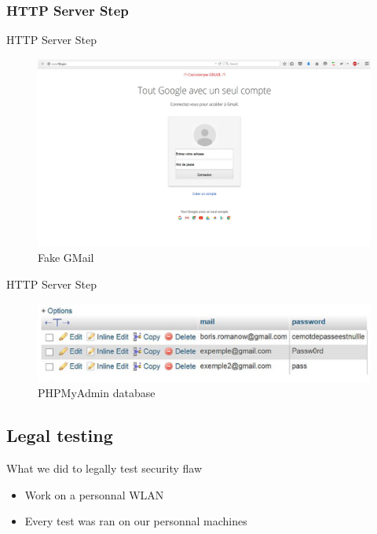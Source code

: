 \documentclass{beamer}
\begin{document}
\subsubsection{HTTP Server Step}
\begin{frame}{HTTP Server Step}
	\begin{figure}[!h]
		\centering
		\includegraphics[scale=0.13]{../images/fakeGMail.eps}
		\caption{Fake GMail}
		\label{fakeGMail}
	\end{figure}
\end{frame}
\begin{frame}{HTTP Server Step}
	\begin{figure}[!h]
		\centering
		\includegraphics[scale=0.3]{../images/database.eps}
		\caption{PHPMyAdmin database}
		\label{database}
	\end{figure}
\end{frame}

\subsection{Legal testing}
\begin{frame}{What we did to legally test security flaw}
	\begin{itemize}
		\item Work on a personnal WLAN\\
		\item Every test was ran on our personnal machines\\
	\end{itemize}
\end{frame}
\end{document}
